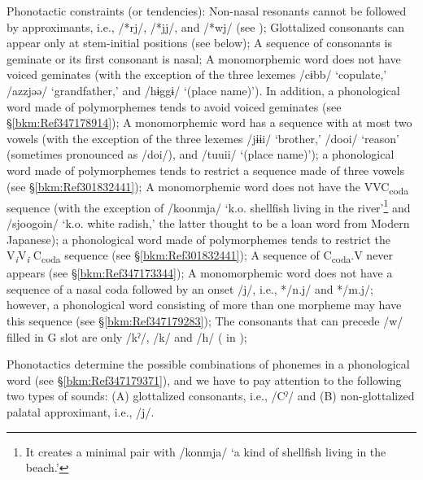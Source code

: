 \ea Phonotactic constraints (or tendencies):\label{ex:2.8}
\ea Non-nasal resonants cannot be followed by approximants, i.e., /*rj/, /*jj/, and /*wj/ (see );\label{ex:2.8a}
\ex Glottalized consonants can appear only at stem-initial positions (see below);\label{ex:2.8b}
\ex A sequence of consonants is geminate or its first consonant is nasal;\label{ex:2.8c}
\ex A monomorphemic word does not have voiced geminates (with the exception of the three lexemes /cɨbb/ ‘copulate,’ /azzjəə/ ‘grandfather,’ and /hɨggɨ/ ‘(place name)’). In addition, a phonological word made of polymorphemes tends to avoid voiced geminates (see §\ref{bkm:Ref347178914});\label{ex:2.8d}
\ex A monomorphemic word has a sequence with at most two vowels (with the exception of the three lexemes /jɨɨi/ ‘brother,’ /dooi/ ‘reason’ (sometimes pronounced as /doi/), and /tuuii/ ‘(place name)’); a phonological word made of polymorphemes tends to restrict a sequence made of three vowels (see §\ref{bkm:Ref301832441});\label{ex:2.8e}
\ex A monomorphemic word does not have the VVC\textsubscript{coda} sequence (with the exception of /koonmja/ ‘k.o. shellfish living in the river’\footnote{It creates a minimal pair with /konmja/ ‘a kind of shellfish living in the beach.’} and /sjoogoin/ ‘k.o. white radish,’ the latter thought to be a loan word from Modern Japanese); a phonological word made of polymorphemes tends to restrict the V\textit{\textsubscript{i}}V\textit{\textsubscript{i} }C\textsubscript{coda} sequence (see §\ref{bkm:Ref301832441});\label{ex:2.8f}
\ex A sequence of C\textsubscript{coda}.V never appears (see §\ref{bkm:Ref347173344});\label{ex:2.8g}
\ex A monomorphemic word does not have a sequence of a nasal coda followed by an onset /j/, i.e., */n.j/ and */m.j/; however, a phonological word consisting of more than one morpheme may have this sequence (see §\ref{bkm:Ref347179283});\label{ex:2.8h}
\ex The consonants that can precede /w/ filled in G slot are only /kˀ/, /k/ and /h/ ( in );\label{ex:2.8i}
\z
\z

Phonotactics determine the possible combinations of phonemes in a phonological word (see §\ref{bkm:Ref347179371}), and we have to pay attention to the following two types of sounds: (A) glottalized consonants, i.e., /Cˀ/ and (B) non-glottalized palatal approximant, i.e., /j/.

